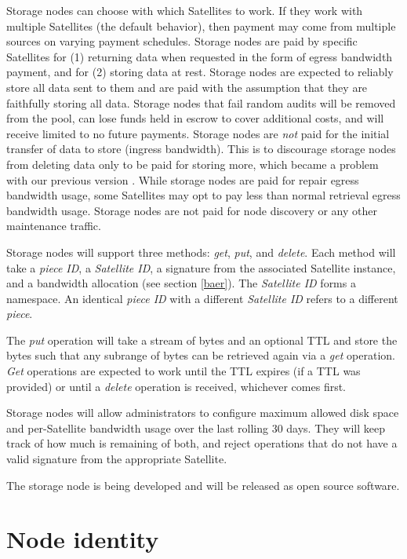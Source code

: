 \documentclass[8pt,fleqn,openany]{book}
\newcommand{\code}[1]{{\em #1}}
\begin{document}
Storage nodes can choose with which Satellites to work. If they work
with multiple Satellites (the default behavior), then payment may come from
multiple sources on varying payment schedules.
Storage nodes are paid by specific Satellites for (1) returning data when
requested in
the form of egress bandwidth payment, and for (2) storing data at rest.
Storage nodes are expected to reliably store all data sent to them and are
paid with the assumption that they are faithfully storing all data.
Storage nodes that fail random audits will be removed from the pool, can lose
funds held in escrow to cover additional costs, and will
receive
limited to no future payments.
Storage nodes are {\em not} paid for the initial transfer of data to store
(ingress bandwidth).
This is to discourage storage nodes from deleting data only to be paid for
storing more, which became a problem with our previous version \cite{storj-v2}.
While storage nodes are paid for repair egress bandwidth usage,
some Satellites may opt to pay less than normal retrieval egress bandwidth
usage.
Storage nodes are not paid for node discovery or any other maintenance traffic.

Storage nodes will support three methods: \code{get}, \code{put}, and
\code{delete}.
Each method will take a {\em piece ID}, a {\em Satellite ID}, a signature
from the associated Satellite instance, and a bandwidth allocation (see
section \ref{baer}).
The {\em Satellite ID} forms a namespace. An identical {\em piece ID} with a
different {\em Satellite ID} refers to a different {\em piece}.

The \code{put} operation will take a stream of bytes and an optional TTL and
store the bytes such
that any subrange of bytes can be retrieved again via a \code{get} operation.
\code{Get} operations are expected to work until the TTL expires (if a TTL was
provided) or until a \code{delete} operation is received, whichever comes
first.

Storage nodes will allow administrators to configure maximum allowed disk
space and per-Satellite bandwidth usage over the last rolling 30 days.
They will keep track of how much is remaining of both, and reject operations
that do not have a valid signature from the appropriate Satellite.

The storage node is being developed and will be released as open source software.

\section{Node identity}\label{sec:node-id}
\end{document}
